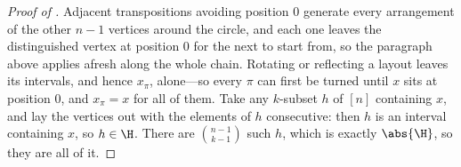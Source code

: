 \begin{proof}[Proof of ]
    Adjacent transpositions avoiding position $0$ generate every arrangement of the other $n - 1$ vertices around the circle, and each one leaves the distinguished vertex at position $0$ for the next to start from, so the paragraph above applies afresh along the whole chain. Rotating or reflecting a layout leaves its intervals, and hence $x_{\pi}$, alone---so every $\pi$ can first be turned until $x$ sits at position $0$, and $x_{\pi} = x$ for all of them. Take any $k$-subset $h$ of $[n]$ containing $x$, and lay the vertices out with the elements of $h$ consecutive: then $h$ is an interval containing $x$, so $h \in \H$. There are $\binom{n-1}{k-1}$ such $h$, which is exactly $\abs{\H}$, so they are all of it.
\end{proof}